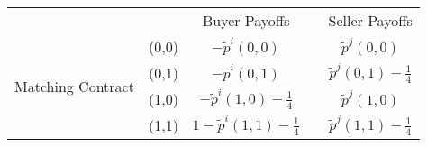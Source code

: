 \documentclass[12pt,letterpaper]{article}           %
\begin{document}
\newpage

\begin{table}[]
	\begin{tabular}{lcccc}
		&                            & Buyer Payoffs         &                       & Seller Payoffs        \\ \cline{3-3} \cline{5-5} 
		& \multicolumn{1}{c|}{(0,0)} & \multicolumn{1}{c|}{$ -\tilde{p}^i(0,0)$} & \multicolumn{1}{c|}{} & \multicolumn{1}{c|}{$ \tilde{p}^j(0,0)$} \\ \cline{3-3} \cline{5-5} 
		\multirow{2}{*}{Matching Contract} & \multicolumn{1}{c|}{(0,1)} & \multicolumn{1}{c|}{$ -\tilde{p}^i(0,1)$} & \multicolumn{1}{c|}{} & \multicolumn{1}{c|}{$ \tilde{p}^j(0,1) -\frac{1}{4}$}  \\ \cline{3-3} \cline{5-5} 
		& \multicolumn{1}{c|}{(1,0)} & \multicolumn{1}{c|}{$ -\tilde{p}^i(1,0) - \frac{1}{4}$} & \multicolumn{1}{c|}{} & \multicolumn{1}{c|}{$ \tilde{p}^j(1,0)$} \\ \cline{3-3} \cline{5-5} 
		& \multicolumn{1}{c|}{(1,1)} & \multicolumn{1}{c|}{$ 1- \tilde{p}^i(1,1) - \frac{1}{4}$} & \multicolumn{1}{c|}{} & \multicolumn{1}{c|}{$ \tilde{p}^j(1,1)- \frac{1}{4}$} \\ \cline{3-3} \cline{5-5} 
	\end{tabular}
\end{table}
\end{document}
